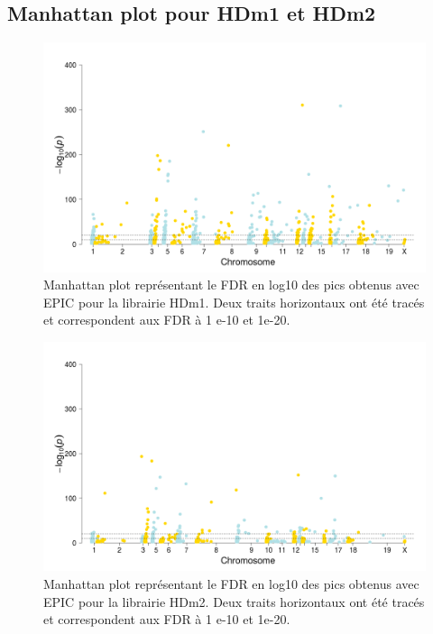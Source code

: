 \documentclass[a4paper,12pt,times]{report}
\newcommand{\scaption}[1]{\caption{\footnotesize{#1}}}
\begin{document}
\begin{appendices}
\section{Manhattan plot pour HDm1 et HDm2}
\begin{figure}[!h]
\centering
\includegraphics [scale=0.45]{manhattanPlot_lib19EPIC.png}
\scaption{Manhattan plot représentant le FDR en log10 des pics obtenus avec EPIC pour la librairie HDm1. Deux traits horizontaux ont été tracés et correspondent aux FDR à 1 e-10 et 1e-20.}
\label{HDm1M}
\end{figure}


\begin{figure}[!h]
\centering
\includegraphics [scale=0.45]{manhattanPlot_lib20EPIC.png}
\scaption{Manhattan plot représentant le FDR en log10 des pics obtenus avec EPIC pour la librairie HDm2. Deux traits horizontaux ont été tracés et correspondent aux FDR à 1 e-10 et 1e-20.}
\label{HDm2M}
\end{figure}





\end{appendices}
\end{document}
